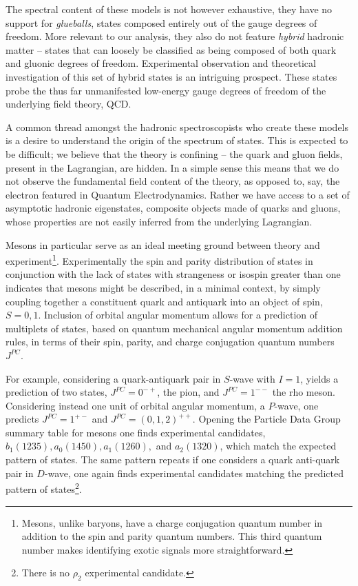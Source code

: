 
The spectral content of these models is not however exhaustive, they have no support for \emph{glueballs}, states composed entirely out of the gauge degrees of freedom. More relevant to our analysis, they also do not feature \emph{hybrid} hadronic matter -- states that can loosely be classified as being composed of both quark and gluonic degrees of freedom. Experimental observation and theoretical investigation of this set of hybrid states is an intriguing prospect. These states probe the thus far unmanifested low-energy gauge degrees of freedom of the underlying field theory, QCD. 

A common thread amongst the hadronic spectroscopists who create these models is a desire to understand the origin of the spectrum of states. This is expected to be difficult; we believe that the theory is confining -- the quark and gluon fields, present in the Lagrangian, are hidden. In a simple sense this means that we do not observe the fundamental field content of the theory, as opposed to, say, the electron featured in Quantum Electrodynamics. Rather we have access to a set of asymptotic hadronic eigenstates, composite objects made of quarks and gluons, whose properties are not easily inferred from the underlying Lagrangian.

Mesons in particular serve as an ideal meeting ground between theory and experiment\footnote{Mesons, unlike baryons, have a charge conjugation quantum number in addition to the spin and parity quantum numbers. This third quantum number makes identifying exotic signals more straightforward.}. Experimentally the spin and parity distribution of states in conjunction with the lack of states with strangeness or isospin greater than one indicates that mesons might be described, in a minimal context, by simply coupling together a constituent quark and antiquark into an object of spin, $S=0,1$. Inclusion of orbital angular momentum allows for a prediction of multiplets of states, based on quantum mechanical angular momentum addition rules, in terms of their spin, parity, and charge conjugation quantum numbers $J^{PC}$. 

For example, considering a quark-antiquark pair in $S$-wave with $I=1$,  yields a prediction of two states, $J^{PC} = 0^{-+}$, the pion, and $J^{PC} = 1^{--}$ the rho meson. Considering instead one unit of orbital angular momentum, a $P$-wave, one predicts $J^{PC} = 1^{+-}$ and $J^{PC} = (0,1,2)^{++}$. Opening the Particle Data Group summary table for mesons one finds experimental candidates, $b_1(1235), a_0(1450), a_1(1260),$ and $a_2(1320)$, which match the expected pattern of states. The same pattern repeats if one considers a quark anti-quark pair in $D$-wave, one again finds experimental candidates matching the predicted pattern of states\footnote{There is no $\rho_2$ experimental candidate.}.


